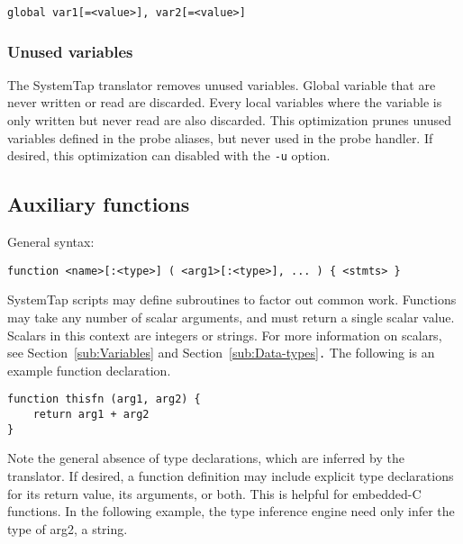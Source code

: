 \documentclass[twoside,english]{article}
\newenvironment{vindent}
{\begin{list}{}{\setlength{\listparindent}{6pt}}
\item[]}
{\end{list}}
\begin{document}
\begin{vindent}
\begin{verbatim}
global var1[=<value>], var2[=<value>]
\end{verbatim}
\end{vindent}

\subsubsection{Unused variables}

The SystemTap translator removes unused variables. Global variable
that are never written or read are discarded.  Every local variables
where the variable is only written but never read are also
discarded. This optimization prunes unused variables defined
in the probe aliases, but never used in the probe handler.
If desired, this optimization can disabled with the \texttt{-u} option.

\subsection{Auxiliary functions\label{sub:Auxiliary-functions}}
General syntax:

\begin{vindent}
\begin{verbatim}
function <name>[:<type>] ( <arg1>[:<type>], ... ) { <stmts> }
\end{verbatim}
\end{vindent}
SystemTap scripts may define subroutines to factor out common work. Functions
may take any number of scalar arguments, and must return a single scalar
value. Scalars in this context are integers or strings. For more information
on scalars, see Section~\ref{sub:Variables} and Section~\ref{sub:Data-types}\texttt{.}
The following is an example function declaration.

\begin{vindent}
\begin{verbatim}
function thisfn (arg1, arg2) {
    return arg1 + arg2
}
\end{verbatim}
\end{vindent}

Note the general absence of type declarations, which are inferred by the
translator. If desired, a function definition may include explicit type declarations
for its return value, its arguments, or both. This is helpful for embedded-C
functions. In the following example, the type inference engine need only
infer the type of arg2, a string.
\end{document}
